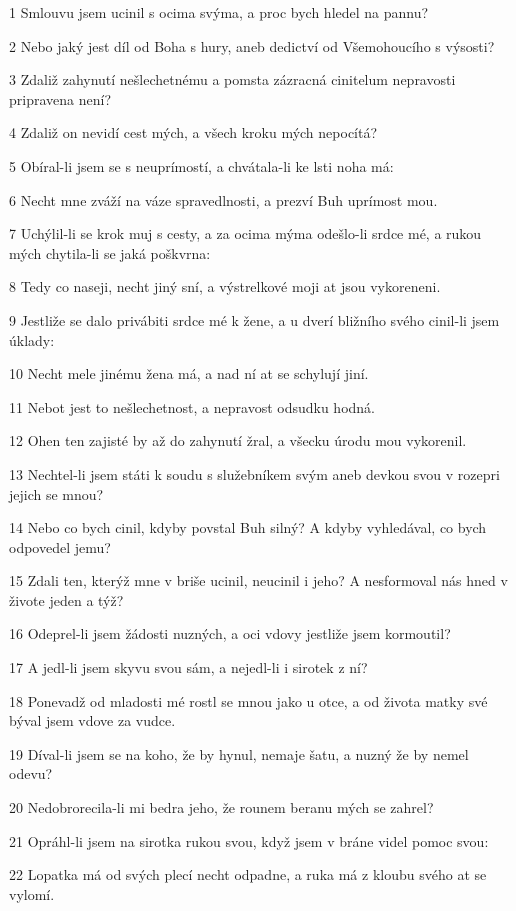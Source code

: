 \par 1 Smlouvu jsem ucinil s ocima svýma, a proc bych hledel na pannu?
\par 2 Nebo jaký jest díl od Boha s hury, aneb dedictví od Všemohoucího s výsosti?
\par 3 Zdaliž zahynutí nešlechetnému a pomsta zázracná cinitelum nepravosti pripravena není?
\par 4 Zdaliž on nevidí cest mých, a všech kroku mých nepocítá?
\par 5 Obíral-li jsem se s neuprímostí, a chvátala-li ke lsti noha má:
\par 6 Necht mne zváží na váze spravedlnosti, a prezví Buh uprímost mou.
\par 7 Uchýlil-li se krok muj s cesty, a za ocima mýma odešlo-li srdce mé, a rukou mých chytila-li se jaká poškvrna:
\par 8 Tedy co naseji, necht jiný sní, a výstrelkové moji at jsou vykoreneni.
\par 9 Jestliže se dalo privábiti srdce mé k žene, a u dverí bližního svého cinil-li jsem úklady:
\par 10 Necht mele jinému žena má, a nad ní at se schylují jiní.
\par 11 Nebot jest to nešlechetnost, a nepravost odsudku hodná.
\par 12 Ohen ten zajisté by až do zahynutí žral, a všecku úrodu mou vykorenil.
\par 13 Nechtel-li jsem státi k soudu s služebníkem svým aneb devkou svou v rozepri jejich se mnou?
\par 14 Nebo co bych cinil, kdyby povstal Buh silný? A kdyby vyhledával, co bych odpovedel jemu?
\par 15 Zdali ten, kterýž mne v briše ucinil, neucinil i jeho? A nesformoval nás hned v živote jeden a týž?
\par 16 Odeprel-li jsem žádosti nuzných, a oci vdovy jestliže jsem kormoutil?
\par 17 A jedl-li jsem skyvu svou sám, a nejedl-li i sirotek z ní?
\par 18 Ponevadž od mladosti mé rostl se mnou jako u otce, a od života matky své býval jsem vdove za vudce.
\par 19 Díval-li jsem se na koho, že by hynul, nemaje šatu, a nuzný že by nemel odevu?
\par 20 Nedobrorecila-li mi bedra jeho, že rounem beranu mých se zahrel?
\par 21 Opráhl-li jsem na sirotka rukou svou, když jsem v bráne videl pomoc svou:
\par 22 Lopatka má od svých plecí necht odpadne, a ruka má z kloubu svého at se vylomí.
